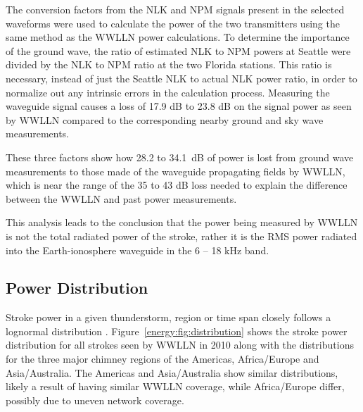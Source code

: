 The conversion factors from the NLK and NPM signals present in the selected waveforms were used to calculate the power of the two transmitters using the same method as the WWLLN power calculations.
To determine the importance of the ground wave, the ratio of estimated NLK to NPM powers at Seattle were divided by the NLK to NPM ratio at the two Florida stations.
This ratio is necessary, instead of just the Seattle NLK to actual NLK power ratio, in order to normalize out any intrinsic errors in the calculation process.
Measuring the waveguide signal causes a loss of 17.9 dB to 23.8 dB on the signal power as seen by WWLLN compared to the corresponding nearby ground and sky wave measurements.

These three factors show how 28.2 to 34.1~dB of power is lost from ground wave measurements to those made of the waveguide propagating fields by WWLLN, which is near the range of the 35 to 43 dB loss needed to explain the difference between the WWLLN and past power measurements.

This analysis leads to the conclusion that the power being measured by WWLLN is not the total radiated power of the stroke, rather it is the RMS power radiated into the Earth-ionosphere waveguide in the 6 -- 18 kHz band.

\subsection{Power Distribution}

Stroke power in a given thunderstorm, region or time span closely follows a lognormal distribution \citep{Golde1977}. Figure~\ref{energy:fig:distribution} shows the stroke power distribution for all strokes seen by WWLLN in 2010 along with the distributions for the three major chimney regions of the Americas, Africa/Europe and Asia/Australia.
The Americas and Asia/Australia show similar distributions, likely a result of having similar WWLLN coverage, while Africa/Europe differ, possibly due to uneven network coverage.

